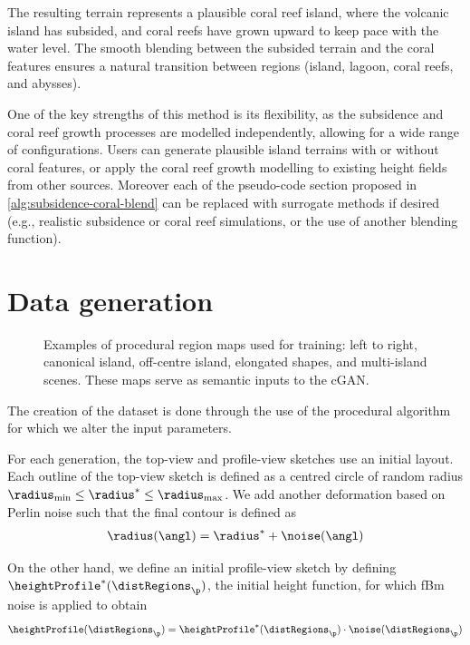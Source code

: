 The resulting terrain represents a plausible coral reef island, where the volcanic island has subsided, and coral reefs have grown upward to keep pace with the water level. The smooth blending between the subsided terrain and the coral features ensures a natural transition between regions (island, lagoon, coral reefs, and abysses).

One of the key strengths of this method is its flexibility, as the subsidence and coral reef growth processes are modelled independently, allowing for a wide range of configurations. Users can generate plausible island terrains with or without coral features, or apply the coral reef growth modelling to existing height fields from other sources. Moreover each of the pseudo-code section proposed in \cref{alg:subsidence-coral-blend} can be replaced with surrogate methods if desired (e.g., realistic subsidence or coral reef simulations, or the use of another blending function).


\section{Data generation}
\label{sec:coral-island-dataset-generation}

\begin{figure}
    \caption[Examples of procedural region maps used for training a cGAN]{Examples of procedural region maps used for training: left to right, canonical island, off-centre island, elongated shapes, and multi-island scenes. These maps serve as semantic inputs to the cGAN.}
    \label{fig:coral-island-difficulties-dataset}
\end{figure}

The creation of the dataset is done through the use of the procedural algorithm for which we alter the input parameters.

For each generation, the top-view and profile-view sketches use an initial layout. Each outline of the top-view sketch is defined as a centred circle of random radius $\radius_\text{min} \leq \radius^* \leq \radius_\text{max}$. We add another deformation based on Perlin noise such that the final contour is defined as
\begin{align}
    \radius(\angl) = \radius^* + \noise(\angl)
\end{align}

On the other hand, we define an initial profile-view sketch by defining $\heightProfile^*(\distRegions_\p)$, the initial height function, for which fBm noise is applied to obtain
\begin{align}
    \heightProfile(\distRegions_\p) = \heightProfile^*(\distRegions_\p) \cdot \noise(\distRegions_\p)
\end{align}

